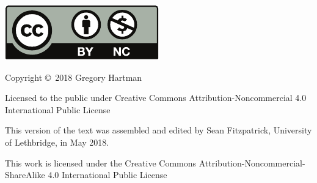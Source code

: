 \noindent\hskip -1in\begin{minipage}{2in}
\includegraphics{text/by-nc} 
\end{minipage}
\begin{minipage}{3in}
\noindent Copyright \copyright\ 2018 Gregory Hartman

Licensed to the public under Creative Commons Attribution-Noncommercial 4.0 International Public License
\end{minipage}

\bigskip

\bigskip



\bigskip

\begin{minipage}{3.3in}
This version of the text was assembled and edited by Sean Fitzpatrick, University of Lethbridge, in May 2018. 

This work is licensed under the Creative Commons Attribution-Noncommercial-ShareAlike 4.0 International Public License
\end{minipage}
